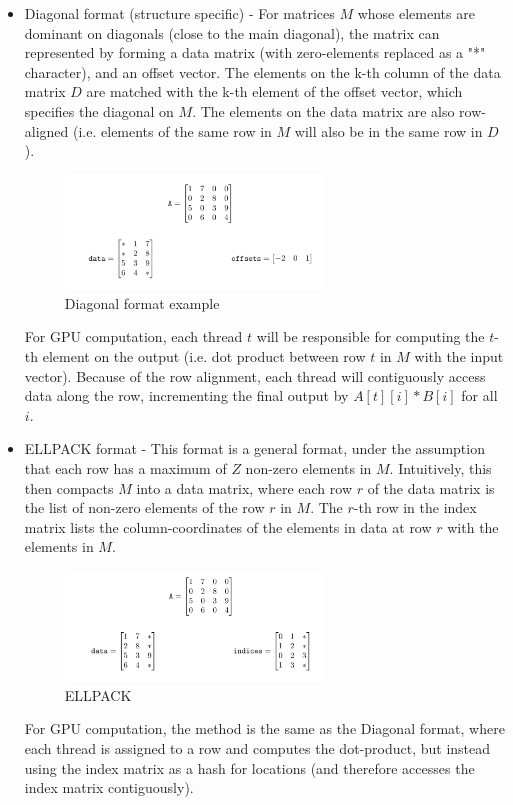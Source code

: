 \documentclass[12pt]{article}
\begin{document}
\begin{itemize}
\item Diagonal format (structure specific) - For matrices $M$ whose elements are dominant on diagonals (close to the main diagonal), the matrix can represented by forming a data matrix (with zero-elements replaced as a "*" character), and an offset vector. The elements on the k-th column of the data matrix $D$ are matched with the k-th element of the offset vector, which specifies the diagonal on $M$. The elements on the data matrix are also row-aligned (i.e. elements of the same row in $M$ will also be in the same row in $D$). 

\begin{figure}[h]
  \caption{Diagonal format example}
  \centering 
  \includegraphics[width = 0.65\textwidth]{diagonal.png}
\end{figure}



\hspace{0.5cm}For GPU computation, each thread $t$ will be responsible for computing the $t$-th element on the output (i.e. dot product between row $t$ in $M$ with the input vector). Because of the row alignment, each thread will contiguously access data along the row, incrementing the final output by $ A[t][i]*B[i] $ for all $i$. 
\item ELLPACK format - This format is a general format, under the assumption that each row has a maximum of $Z$ non-zero elements in $M$. Intuitively, this then compacts $M$ into a data matrix, where each row $r$ of the data matrix is the list of non-zero elements of the row $r$ in $M$. The $r$-th row in the index matrix lists the column-coordinates of the elements in data at row $r$ with the elements in $M$. 


\begin{figure}[h]
  \caption{ELLPACK}
  \centering 
  \includegraphics[width = 0.65\textwidth]{ellpack.png}
\end{figure}
\hspace{0.5cm}For GPU computation, the method is the same as the Diagonal format, where each thread is assigned to a row and computes the dot-product, but instead using the index matrix as a hash for locations (and therefore accesses the index matrix contiguously).


\end{itemize}
\end{document}
